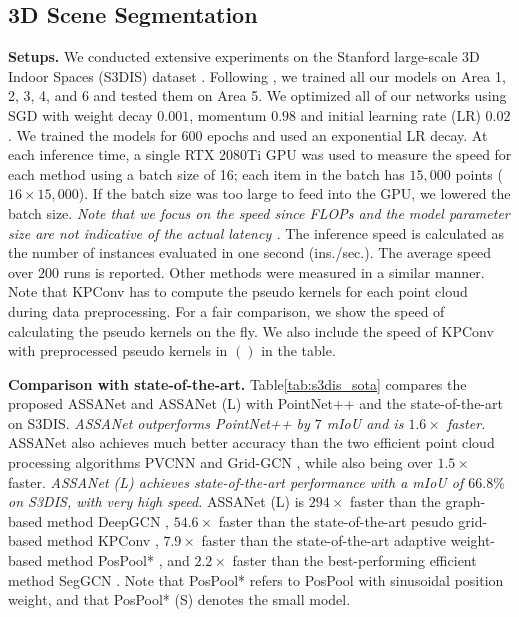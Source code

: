 \documentclass{article}
\newcommand{\tblLabel}{Table\xspace}
\newcommand{\mysection}[1]{\vspace{3pt}\noindent\textbf{#1.}}
\begin{document}
\subsection{3D Scene Segmentation}
\mysection{Setups} 
We conducted extensive experiments on the Stanford large-scale 3D Indoor Spaces (S3DIS) dataset \cite{s3dis}. Following \cite{PointCNN, Liu2019PointVoxelCF, Liu2020ACL}, we trained all our models on Area 1, 2, 3, 4, and 6 and tested them on Area 5. We optimized all of our networks using SGD with weight decay $0.001$, momentum $0.98$ and initial learning rate (LR) $0.02$. We trained the models for $600$ epochs and used an exponential LR decay. At each inference time, a single RTX 2080Ti GPU was used to measure the speed for each method using a batch size of 16; each item in the batch has $15,000$ points ($16 \times 15,000$). If the batch size was too large to feed into the GPU, we lowered the batch size. \textit{Note that we focus on the speed since FLOPs and the model parameter size are not indicative of the actual latency \cite{Ma2018ShuffleNetVP, Liu2019PointVoxelCF}.}  The inference speed is calculated as the number of instances evaluated in one second (ins./sec.). The average speed over $200$ runs is reported. Other methods were measured in a similar manner. Note that KPConv \cite{Thomas2019KPConvFA} has to compute the pseudo kernels for each point cloud during data preprocessing. For a fair comparison, we show the speed of calculating the pseudo kernels on the fly.  We also include the speed of KPConv with preprocessed pseudo kernels in $()$ in the table.


\mysection{Comparison with state-of-the-art}
\tblLabel \ref{tab:s3dis_sota} compares the proposed ASSANet and ASSANet (L) with PointNet++ \cite{Qi2017PointNetDH} and the state-of-the-art on S3DIS. \textit{ASSANet outperforms PointNet++ by $7$ mIoU and is $1.6\times$ faster.} ASSANet also achieves much better accuracy than the two efficient point cloud processing algorithms PVCNN \cite{Liu2019PointVoxelCF} and Grid-GCN \cite{Xu2020GridGCNFF}, while also being over $1.5\times$ faster. 
\textit{ASSANet (L) achieves state-of-the-art performance with a mIoU of $66.8 \%$ on S3DIS, with very high speed.} ASSANet (L) is $294 \times$ faster than the graph-based method DeepGCN \cite{Li2019DeepGCNs}, $54.6 \times$ faster than the state-of-the-art pesudo grid-based method KPConv \cite{Thomas2019KPConvFA}, $7.9 \times$ faster than the state-of-the-art adaptive weight-based method PosPool* \cite{Liu2020ACL}, and $2.2 \times$ faster than the best-performing efficient method SegGCN \cite{Lei2020SegGCNE3}. Note that PosPool* refers to PosPool with sinusoidal position weight, and that PosPool* (S) denotes the small model.
\end{document}
